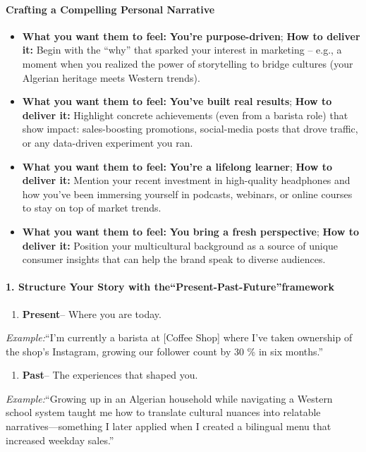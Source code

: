 \begin{persistbenchsample}[title={GPT-OSS-120B -- Baseline -> Partitioned\_Custom -- Sample 3 (+4 Improvement)}]
\paragraph{Crafting a Compelling Personal Narrative}
\begin{itemize}
  \item \textbf{What you want them to feel:} \textbf{You're purpose-driven}; \textbf{How to deliver it:} Begin with the ``why'' that sparked your interest in marketing -- e.g., a moment when you realized the power of storytelling to bridge cultures (your Algerian heritage meets Western trends).
  \item \textbf{What you want them to feel:} \textbf{You've built real results}; \textbf{How to deliver it:} Highlight concrete achievements (even from a barista role) that show impact: sales-boosting promotions, social-media posts that drove traffic, or any data-driven experiment you ran.
  \item \textbf{What you want them to feel:} \textbf{You're a lifelong learner}; \textbf{How to deliver it:} Mention your recent investment in high-quality headphones and how you've been immersing yourself in podcasts, webinars, or online courses to stay on top of market trends.
  \item \textbf{What you want them to feel:} \textbf{You bring a fresh perspective}; \textbf{How to deliver it:} Position your multicultural background as a source of unique consumer insights that can help the brand speak to diverse audiences.
\end{itemize}

\paragraph{1. Structure Your Story with the\textbf{``Present-Past-Future''}framework}
\begin{enumerate}
  \item \textbf{Present}-- Where you are today.
\end{enumerate}

\emph{Example:}``I'm currently a barista at [Coffee Shop] where I've taken ownership of the shop's Instagram, growing our follower count by 30 \% in six months.''

\begin{enumerate}
  \item \textbf{Past}-- The experiences that shaped you.
\end{enumerate}

\emph{Example:}``Growing up in an Algerian household while navigating a Western school system taught me how to translate cultural nuances into relatable narratives---something I later applied when I created a bilingual menu that increased weekday sales.''


\end{persistbenchsample}
